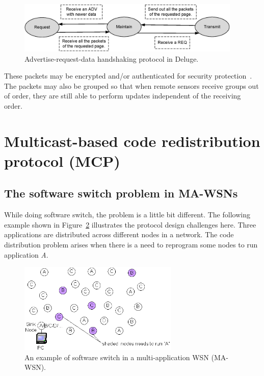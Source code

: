\begin{figure}[htbp]
\centering
\includegraphics[width=4.2in]{figures/deluge.eps}
\caption{Advertise-request-data handshaking protocol in Deluge.}
\label{fdeluge}
\end{figure}

These packets may be
encrypted and/or authenticated for security protection~\cite{sluice,secDiss1}. The
packets may also be grouped so that when remote sensors receive groups
out of order, they are still able to perform updates independent of
the receiving order.


\section{Multicast-based code redistribution protocol (MCP)}
	
\subsection{The software switch problem in MA-WSNs}
	
While doing software switch, the problem is a little bit different. The following example shown in Figure~\ref{fnet} 
illustrates the protocol design challenges here. 
Three applications are distributed across different nodes in a network. The code distribution problem arises when there 
is a need to reprogram some nodes to run application {\it A}.

\begin{figure}[htbp]
\begin{center}
\includegraphics[width=3in]{figures/fnet.eps}
\caption{An example of software switch in a multi-application WSN (MA-WSN).}
\label{fnet}
\end{center}
\end{figure}

